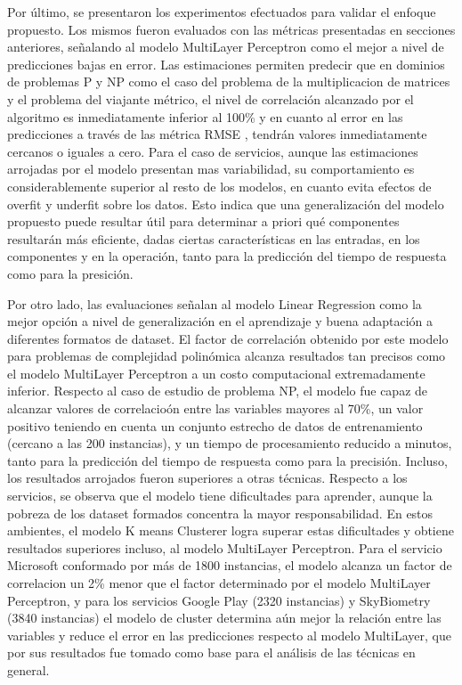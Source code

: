 Por último, se presentaron los experimentos efectuados para validar
el enfoque propuesto. Los mismos fueron evaluados con las métricas
presentadas en secciones anteriores, señalando al modelo MultiLayer
Perceptron como el mejor a nivel de predicciones bajas en error. Las
estimaciones permiten predecir que en dominios de problemas P y NP
como el caso del problema de la multiplicacion de matrices y el problema
del viajante métrico, el nivel de correlación alcanzado por el algoritmo
es inmediatamente inferior al 100\% y en cuanto al error en las predicciones
a través de las métrica \ac{RMSE} , tendrán valores inmediatamente
cercanos o iguales a cero. Para el caso de servicios, aunque las estimaciones
arrojadas por el modelo presentan mas variabilidad, su comportamiento
es considerablemente superior al resto de los modelos, en cuanto evita
efectos de overfit y underfit sobre los datos. Esto indica que una
generalización del modelo propuesto puede resultar útil para determinar
a priori qué componentes resultarán más eficiente, dadas ciertas características
en las entradas, en los componentes y en la operación, tanto para
la predicción del tiempo de respuesta como para la presición.

Por otro lado, las evaluaciones señalan al modelo Linear Regression
como la mejor opción a nivel de generalización en el aprendizaje y
buena adaptación a diferentes formatos de dataset. El factor de correlación
obtenido por este modelo para problemas de complejidad polinómica
alcanza resultados tan precisos como el modelo MultiLayer Perceptron
a un costo computacional extremadamente inferior. Respecto al caso
de estudio de problema NP, el modelo fue capaz de alcanzar valores
de correlacioón entre las variables mayores al 70\%, un valor positivo
teniendo en cuenta un conjunto estrecho de datos de entrenamiento
(cercano a las 200 instancias), y un tiempo de procesamiento reducido
a minutos, tanto para la predicción del tiempo de respuesta como para
la precisión. Incluso, los resultados arrojados fueron superiores
a otras técnicas. Respecto a los servicios, se observa que el modelo
tiene dificultades para aprender, aunque la pobreza de los dataset
formados concentra la mayor responsabilidad. En estos ambientes, el
modelo K means Clusterer logra superar estas dificultades y obtiene
resultados superiores incluso, al modelo MultiLayer Perceptron. Para
el servicio Microsoft conformado por más de 1800 instancias, el modelo
alcanza un factor de correlacion un 2\% menor que el factor determinado
por el modelo MultiLayer Perceptron, y para los servicios Google Play
(2320 instancias) y SkyBiometry (3840 instancias) el modelo de cluster
determina aún mejor la relación entre las variables y reduce el error
en las predicciones respecto al modelo MultiLayer, que por sus resultados
fue tomado como base para el análisis de las técnicas en general. 


